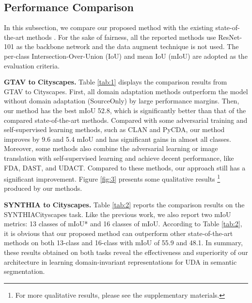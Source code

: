 \documentclass[sigconf]{acmart}
\begin{document}
\subsection{Performance Comparison}



\par In this subsection, we compare our proposed method with the existing state-of-the-art methods \cite{tsai2018learning,vu2019advent,luo2019taking,li2019bidirectional,tsai2019domain,lian2019constructing,pan2020unsupervised,kim2020learning,yang2020fda,wang2020classes,yang2020label,li2020content,yu2021dast,lee2020unsupervised}. For the sake of fairness, all the reported methods use ResNet-101 as the backbone network and the data augment technique is not used. The per-class Intersection-Over-Union (IoU) and mean IoU (mIoU) are adopted as the evaluation criteria.

\par \textbf{GTAV to Cityscapes.} Table \ref{tab:1} displays the comparison results from GTAV to Cityscapes. First, all domain adaptation methods outperform the model without domain adaptation (SourceOnly) by large performance margins. Then, our method has the best mIoU 52.8, which is significantly better than that of the compared state-of-the-art methods. Compared with some adversarial training and self-supervised learning methods, such as CLAN and PyCDA, our method improves by 9.6 and 5.4 mIoU and has significant gains in almost all classes. Moreover, some methods also combine the adversarial learning or image translation with self-supervised learning and achieve decent performance, like FDA, DAST, and UDACT. Compared to these methods, our approach still has a significant improvement. Figure \ref{fig:3} presents some qualitative results \footnote{For more qualitative results, please see the supplementary materials.} produced by our methods. 


\par \textbf{SYNTHIA to Cityscapes.} Table \ref{tab:2} reports the comparison results on the SYNTHIACityscapes task. Like the previous work, we also report two mIoU metrics: 13 classes of mIoU* and 16 classes of mIoU. According to Table \ref{tab:2}, it is obvious that our proposed method can outperform other state-of-the-art methods on both 13-class and 16-class with mIoU of 55.9 and 48.1. In summary, these results obtained on both tasks reveal the effectiveness and superiority of our architecture in learning domain-invariant representations for UDA in semantic segmentation.
\end{document}
